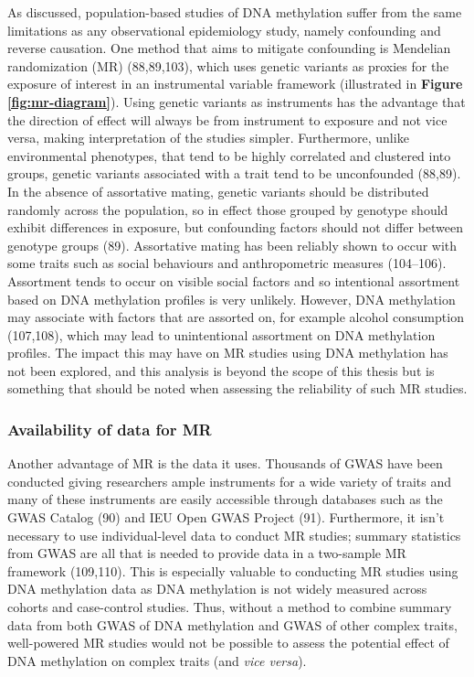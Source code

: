 \documentclass[11pt,oneside]{bristolthesis}
\begin{document}
As discussed, population-based studies of DNA methylation suffer from the same limitations as any observational epidemiology study, namely confounding and reverse causation. One method that aims to mitigate confounding is Mendelian randomization (MR) (88,89,103), which uses genetic variants as proxies for the exposure of interest in an instrumental variable framework (illustrated in \textbf{Figure \ref{fig:mr-diagram}}). Using genetic variants as instruments has the advantage that the direction of effect will always be from instrument to exposure and not vice versa, making interpretation of the studies simpler. Furthermore, unlike environmental phenotypes, that tend to be highly correlated and clustered into groups, genetic variants associated with a trait tend to be unconfounded (88,89). In the absence of assortative mating, genetic variants should be distributed randomly across the population, so in effect those grouped by genotype should exhibit differences in exposure, but confounding factors should not differ between genotype groups (89). Assortative mating has been reliably shown to occur with some traits such as social behaviours and anthropometric measures (104--106). Assortment tends to occur on visible social factors and so intentional assortment based on DNA methylation profiles is very unlikely. However, DNA methylation may associate with factors that are assorted on, for example alcohol consumption (107,108), which may lead to unintentional assortment on DNA methylation profiles. The impact this may have on MR studies using DNA methylation has not been explored, and this analysis is beyond the scope of this thesis but is something that should be noted when assessing the reliability of such MR studies.

\hypertarget{availability-of-data-for-mr}{%
\subsubsection{Availability of data for MR}\label{availability-of-data-for-mr}}

Another advantage of MR is the data it uses. Thousands of GWAS have been conducted giving researchers ample instruments for a wide variety of traits and many of these instruments are easily accessible through databases such as the GWAS Catalog (90) and IEU Open GWAS Project (91). Furthermore, it isn't necessary to use individual-level data to conduct MR studies; summary statistics from GWAS are all that is needed to provide data in a two-sample MR framework (109,110). This is especially valuable to conducting MR studies using DNA methylation data as DNA methylation is not widely measured across cohorts and case-control studies. Thus, without a method to combine summary data from both GWAS of DNA methylation and GWAS of other complex traits, well-powered MR studies would not be possible to assess the potential effect of DNA methylation on complex traits (and \emph{vice versa}).
\end{document}
